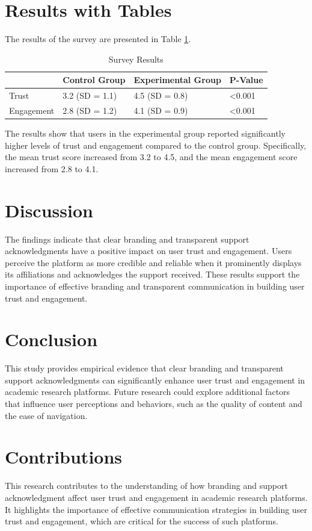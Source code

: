 \documentclass{article}
\begin{document}
\section*{Results with Tables}
The results of the survey are presented in Table \ref{tab:results}.

\begin{table}[htbp]
\centering
\caption{Survey Results}
\label{tab:results}
\begin{tabular}{@{}llll@{}}
\toprule
& Control Group & Experimental Group & P-Value \\ \midrule
Trust & 3.2 (SD = 1.1) & 4.5 (SD = 0.8) & <0.001 \\
Engagement & 2.8 (SD = 1.2) & 4.1 (SD = 0.9) & <0.001 \\ \bottomrule
\end{tabular}
\end{table}

The results show that users in the experimental group reported significantly higher levels of trust and engagement compared to the control group. Specifically, the mean trust score increased from 3.2 to 4.5, and the mean engagement score increased from 2.8 to 4.1.

\section*{Discussion}
The findings indicate that clear branding and transparent support acknowledgments have a positive impact on user trust and engagement. Users perceive the platform as more credible and reliable when it prominently displays its affiliations and acknowledges the support received. These results support the importance of effective branding and transparent communication in building user trust and engagement.

\section*{Conclusion}
This study provides empirical evidence that clear branding and transparent support acknowledgments can significantly enhance user trust and engagement in academic research platforms. Future research could explore additional factors that influence user perceptions and behaviors, such as the quality of content and the ease of navigation.

\section*{Contributions}
This research contributes to the understanding of how branding and support acknowledgment affect user trust and engagement in academic research platforms. It highlights the importance of effective communication strategies in building user trust and engagement, which are critical for the success of such platforms.
\end{document}
